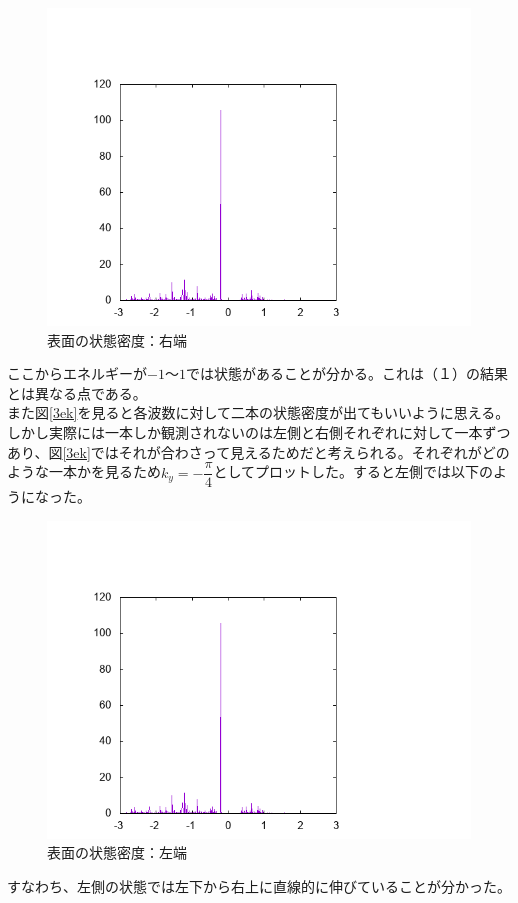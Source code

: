 \documentclass{jarticle}
\begin{document}
\begin{figure}[H]
	\centering
	\includegraphics[scale=0.7]{../../20/KS/20-5/graph/data.png}
	\caption{表面の状態密度：右端}
\end{figure}
ここからエネルギーが$-1$〜$1$では状態があることが分かる。これは（１）の結果とは異なる点である。\\
また図\ref{3ek}を見ると各波数に対して二本の状態密度が出てもいいように思える。しかし実際には一本しか観測されないのは左側と右側それぞれに対して一本ずつあり、図\ref{3ek}ではそれが合わさって見えるためだと考えられる。それぞれがどのような一本かを見るため$k_y=-\dfrac{\pi}{4}$としてプロットした。すると左側では以下のようになった。
\begin{figure}[H]
	\centering
	\includegraphics[scale=0.7]{../../20/KS/20-6/graph/data.png}
	\caption{表面の状態密度：左端}
\end{figure}
すなわち、左側の状態では左下から右上に直線的に伸びていることが分かった。
\end{document}
